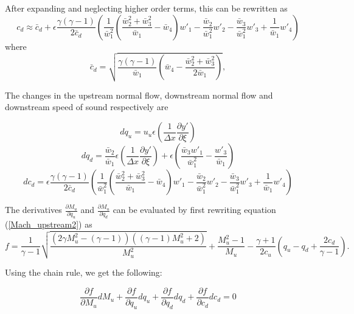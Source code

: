 \documentclass[10pt]{article}
\begin{document}
	After expanding and neglecting higher order terms, this can be rewritten as
	\begin{equation}
		c_d \approx \bar{c}_d+ \epsilon \frac{\gamma (\gamma - 1)}{2 \bar{c}_d} \left( \frac{1}{\bar{w}_1^2} \left( \frac{\bar{w}_2^2 + \bar{w}_3^2}{\bar{w}_1} - \bar{w}_4 \right) w'_1 - \frac{\bar{w}_2}{\bar{w}_1^2} w'_2 - \frac{\bar{w}_3}{\bar{w}_1^2} w'_3 + \frac{1}{\bar{w}_1} w'_4\right)
	\end{equation}
	where
	\begin{equation}
		\bar{c}_d = \sqrt{ \frac{\gamma (\gamma - 1)}{\bar{w}_1} \left( \bar{w}_4 - \frac{\bar{w}_2^2 + \bar{w}^2_3}{2 \bar{w}_1} \right) },
	\end{equation}
	
	The changes in the upstream normal flow, downstream normal flow and downstream speed of sound respectively are
	
	\begin{equation}
		dq_u = u_u \epsilon \left(\frac{1}{\Delta x} \frac{\partial 	y'}{\partial \xi} \right)
	\end{equation}
	\begin{equation}
		dq_d = \frac{\bar{w}_2}{\bar{w}_1} \epsilon \left(\frac{1}{\Delta x} \frac{\partial y'}{\partial \xi} \right) + \epsilon \left( \frac{\bar{w}_3 w'_1}{\bar{w}_1^2} - \frac{w'_3}{\bar{w}_1} \right)
	\end{equation}
	\begin{equation}
		dc_d = \epsilon \frac{\gamma (\gamma - 1)}{2 \bar{c}_d} \left( \frac{1}{\bar{w}_1^2} \left( \frac{\bar{w}_2^2 + \bar{w}_3^2}{\bar{w}_1} - \bar{w}_4 \right) w'_1 - \frac{\bar{w}_2}{\bar{w}_1^2} w'_2 - \frac{\bar{w}_3}{\bar{w}_1^2} w'_3 + \frac{1}{\bar{w}_1} w'_4\right)
	\end{equation}

	The derivatives $\frac{\partial M_u}{\partial q_u}$ and $\frac{\partial M_u}{\partial q_d}$ can be evaluated by first rewriting equation (\ref{Mach_upstream2}) as
	\begin{equation}
		f = \frac{1}{\gamma-1} \sqrt{ \frac{(2\gamma M_u^2-(\gamma-1))((\gamma-1)M_u^2+2)}{M_u^2}}+\frac{M_u^2-1}{M_u} - \frac{\gamma+1}{2c_u} \left( q_u - q_d + \frac{2c_d}{\gamma - 1} \right).
	\end{equation}
	
	Using the chain rule, we get the following:
	
	\begin{equation}
		\frac{\partial f}{\partial M_u} dM_u + \frac{\partial f}{\partial q_u} dq_u + \frac{\partial f}{\partial q_d} dq_d + \frac{\partial f}{\partial c_d} dc_d = 0
	\end{equation}
	
\end{document}
